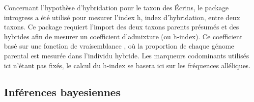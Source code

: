 Concernant l'hypothèse d'hybridation pour le taxon des Écrins, le package introgress \citep{Gompert2010} a été utilisé pour mesurer l'index h, index d'hybridation, entre deux taxons.
Ce package requiert l'import des deux taxons parents présumés et des hybrides afin de mesurer un coefficient d'admixture (ou h-index).
Ce coefficient basé sur une fonction de vraisemblance \citep{Buerkle2005}, où la proportion de chaque génome parental est mesurée dans l'individu hybride.
Les marqueurs codominants utilisés ici n'étant pas fixés, le calcul du h-index se basera ici sur les fréquences alléliques.



\subsection{Inférences bayesiennes}

